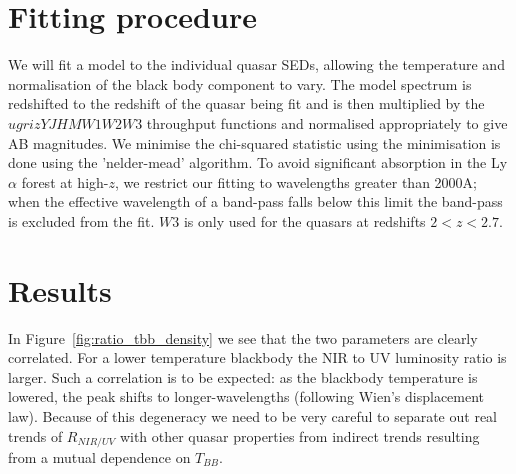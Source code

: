 \section{Fitting procedure}

We will fit a model to the individual quasar SEDs, allowing the temperature and normalisation of the black body component to vary. 
The model spectrum is redshifted to the redshift of the quasar being fit and is then multiplied by the $ugrizYJHMW1W2W3$ throughput functions and normalised appropriately to give AB magnitudes. 
We minimise the chi-squared statistic using the minimisation is done using the 'nelder-mead' algorithm.
To avoid significant absorption in the Ly$\alpha$ forest at high-$z$, we restrict our fitting to wavelengths greater than 2000A; when the effective wavelength of a band-pass falls below this limit the band-pass is excluded from the fit. 
$W3$ is only used for the quasars at redshifts $2 < z < 2.7$. 

\section{Results}


In Figure~\ref{fig:ratio_tbb_density} we see that the two parameters are clearly correlated. 
For a lower temperature blackbody the NIR to UV luminosity ratio is larger. 
Such a correlation is to be expected: as the blackbody temperature is lowered, the peak shifts to longer-wavelengths (following Wien's displacement law). 
Because of this degeneracy we need to be very careful to separate out real trends of $R_{NIR/UV}$ with other quasar properties from indirect trends resulting from a mutual dependence on $T_{BB}$.  


